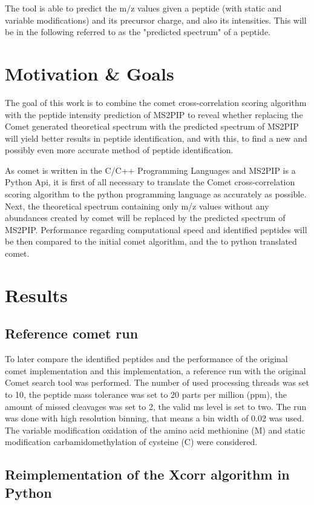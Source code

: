 \documentclass[11pt]{article}
\begin{document}
The tool is able to predict the m/z values given a peptide (with static and variable modifications) and its precursor charge, and also its intensities. This will be in the following referred to as the "predicted spectrum" of a peptide.

\section{Motivation \& Goals}
The goal of this work is to combine the comet cross-correlation scoring algorithm
with the peptide intensity prediction of MS2PIP to reveal whether replacing the Comet generated theoretical spectrum with the predicted spectrum of MS2PIP will yield better results in peptide identification, and with this, to find a new and possibly even more accurate method of peptide identification.

As comet is written in the C/C++ Programming Languages and MS2PIP is a Python Api, it is first of all necessary to translate the Comet cross-correlation scoring algorithm to the python programming language as accurately as possible. Next, the theoretical spectrum containing only m/z values without any abundances created by comet will be replaced by the predicted spectrum of MS2PIP. Performance regarding computational speed and identified peptides will be then compared to the initial comet algorithm, and the to python translated comet. 


\section{Results}

\subsection{Reference comet run}
To later compare the identified peptides and the performance of the original comet implementation and this implementation, a reference run with the original Comet search tool was performed. The number of used processing threads was set to 10, the peptide mass tolerance was set to 20 parts per million (ppm), the amount of missed cleavages was set to 2, the valid ms level is set to two. The run was done with high resolution binning, that means a bin width of 0.02 was used. The variable modification oxidation of the amino acid methionine (M) and static modification carbamidomethylation of cysteine (C) were considered.

\subsection{Reimplementation of the Xcorr algorithm in Python}
\end{document}
